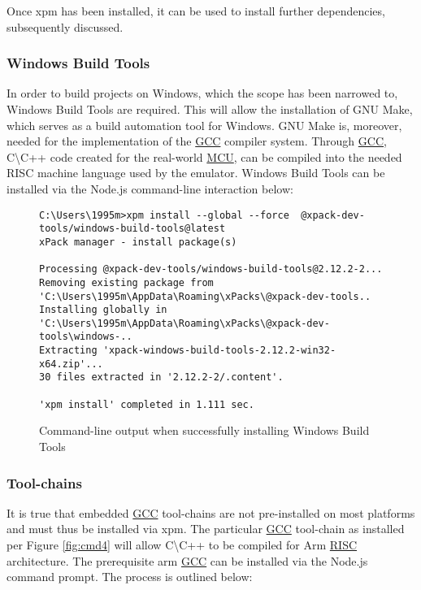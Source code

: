 Once xpm has been installed, it can be used to install further dependencies, subsequently discussed.

\subsubsection{Windows Build Tools}
\label{make}
In order to build projects on Windows, which the scope has been narrowed to, Windows Build Tools are required. This will allow the installation of GNU Make, which serves as a build automation tool for Windows. GNU Make is, moreover, needed for the implementation of the \hyperref[listAbr]{GCC} compiler system. Through \hyperref[listAbr]{GCC}, C\textbackslash C++ code created for the real-world \hyperref[listAbr]{MCU}, can be compiled into the needed RISC machine language used by the emulator. Windows Build Tools can be installed via the Node.js command-line interaction below:



\begin{figure}[H]
\begin{center}
\begin{lstlisting}[style=DOS]
C:\Users\1995m>xpm install --global --force  @xpack-dev-tools/windows-build-tools@latest
xPack manager - install package(s)

Processing @xpack-dev-tools/windows-build-tools@2.12.2-2...
Removing existing package from 'C:\Users\1995m\AppData\Roaming\xPacks\@xpack-dev-tools..
Installing globally in 'C:\Users\1995m\AppData\Roaming\xPacks\@xpack-dev-tools\windows-..
Extracting 'xpack-windows-build-tools-2.12.2-win32-x64.zip'...
30 files extracted in '2.12.2-2/.content'.

'xpm install' completed in 1.111 sec.
\end{lstlisting}
\caption{Command-line output when successfully installing Windows Build Tools}
\label{fig:cmd3}
\end{center}
\end{figure}

\subsubsection{Tool-chains}
\label{toolchains}
It is true that embedded \hyperref[listAbr]{GCC} tool-chains are not pre-installed on most platforms and must thus be installed via xpm. The particular \hyperref[listAbr]{GCC} tool-chain as installed per Figure \ref{fig:cmd4} will allow C\textbackslash C++ to be compiled for Arm \hyperref[listAbr]{RISC} architecture. The prerequisite arm \hyperref[listAbr]{GCC} can be installed via the Node.js command prompt. The process is outlined below:

